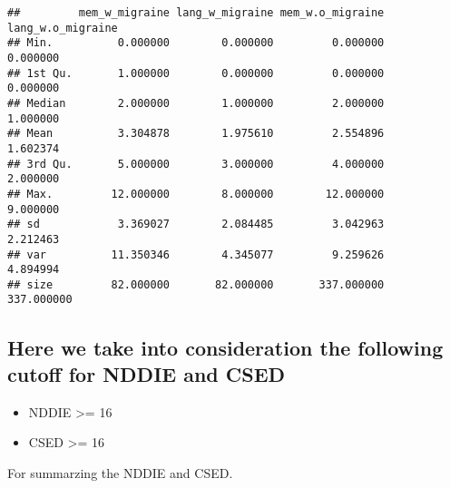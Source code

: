 \documentclass[]{article}
\begin{document}
\begin{verbatim}
##         mem_w_migraine lang_w_migraine mem_w.o_migraine lang_w.o_migraine
## Min.          0.000000        0.000000         0.000000          0.000000
## 1st Qu.       1.000000        0.000000         0.000000          0.000000
## Median        2.000000        1.000000         2.000000          1.000000
## Mean          3.304878        1.975610         2.554896          1.602374
## 3rd Qu.       5.000000        3.000000         4.000000          2.000000
## Max.         12.000000        8.000000        12.000000          9.000000
## sd            3.369027        2.084485         3.042963          2.212463
## var          11.350346        4.345077         9.259626          4.894994
## size         82.000000       82.000000       337.000000        337.000000
\end{verbatim}

\subsection{Here we take into consideration the following cutoff for
NDDIE and
CSED}\label{here-we-take-into-consideration-the-following-cutoff-for-nddie-and-csed}

\begin{itemize}
\item
  NDDIE \textgreater{}= 16
\item
  CSED \textgreater{}= 16
\end{itemize}

For summarzing the NDDIE and CSED.
\end{document}
